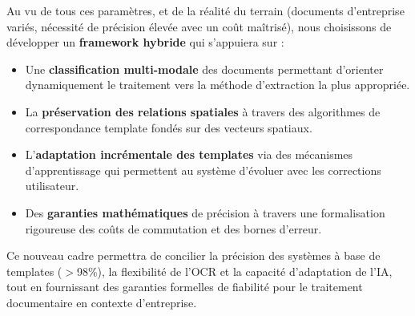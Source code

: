 Au vu de tous ces paramètres, et de la réalité du terrain (documents d'entreprise variés, nécessité de précision élevée avec un coût maîtrisé), nous choisissons de développer un \textbf{framework hybride} qui s'appuiera sur :

\begin{itemize}[label=, font=\large \color{darkgray}]
\item Une \textbf{classification multi-modale} des documents permettant d'orienter dynamiquement le traitement vers la méthode d'extraction la plus appropriée.
\item La \textbf{préservation des relations spatiales} à travers des algorithmes de correspondance template fondés sur des vecteurs spatiaux.
\item L'\textbf{adaptation incrémentale des templates} via des mécanismes d'apprentissage qui permettent au système d'évoluer avec les corrections utilisateur.
\item Des \textbf{garanties mathématiques} de précision à travers une formalisation rigoureuse des coûts de commutation et des bornes d'erreur.
\end{itemize}

Ce nouveau cadre permettra de concilier la précision des systèmes à base de templates ($>$98\%), la flexibilité de l'OCR et la capacité d'adaptation de l'IA, tout en fournissant des garanties formelles de fiabilité pour le traitement documentaire en contexte d'entreprise.